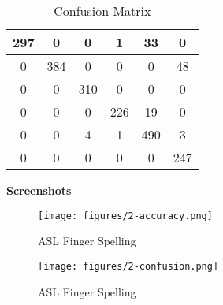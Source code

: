 \begin{table}[h]
  \centering
  \begin{tabular}{|c|c|c|c|c|c|}
  \midrule
  297 & 0   & 0   & 1   & 33  & 0   \\ \midrule
  0   & 384 & 0   & 0   & 0   & 48  \\ \midrule
  0   & 0   & 310 & 0   & 0   & 0   \\ \midrule
  0   & 0   & 0   & 226 & 19  & 0   \\ \midrule
  0   & 0   & 4   & 1   & 490 & 3   \\ \midrule
  0   & 0   & 0   & 0   & 0   & 247 \\ \midrule
  \end{tabular}
  \caption{Confusion Matrix}
  \label{tab:confusion-matrix}
\end{table}

\textbf{Screenshots}
\begin{figure}[H]
  \centering
  \begin{minipage}[b]{0.59\textwidth}
    \centering
    \texttt{[image: figures/2-accuracy.png]}
    \caption{ASL Finger Spelling}
    \label{fig:asl-fs-1}
  \end{minipage}
  \hfill
  \begin{minipage}[b]{0.39\textwidth}
    \centering
    \texttt{[image: figures/2-confusion.png]}
    \caption{ASL Finger Spelling}
    \label{fig:asl-fs-2}
  \end{minipage}
\end{figure}

